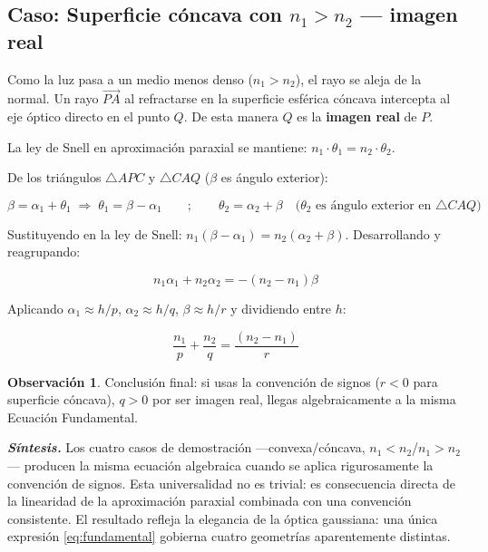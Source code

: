 \documentclass[12pt, a4paper]{article}
\theoremstyle{definition}
\newtheorem{observacion}{Observación}[section]
\begin{document}
\subsection{Caso: Superficie cóncava con \texorpdfstring{\(n_1 > n_2\)}{n1 > n2}
            --- imagen real}

Como la luz pasa a un medio menos denso (\(n_1 > n_2\)), el rayo se aleja de la normal.
Un rayo \(\overrightarrow{PA}\) al refractarse en la superficie esférica cóncava intercepta
al eje óptico directo en el punto \(Q\). De esta manera \(Q\) es la \textbf{imagen real}
de \(P\).

La ley de Snell en aproximación paraxial se mantiene: \(n_1 \cdot \theta_1 = n_2 \cdot
\theta_2\).

De los triángulos \(\triangle APC\) y \(\triangle CAQ\) (\(\beta\) es ángulo exterior):

\[
  \beta = \alpha_1 + \theta_1 \;\Rightarrow\; \theta_1 = \beta - \alpha_1 \qquad;\qquad
  \theta_2 = \alpha_2 + \beta \quad\text{(\(\theta_2\) es ángulo exterior en \(\triangle
  CAQ\))}
\]

Sustituyendo en la ley de Snell: \(n_1(\beta - \alpha_1) = n_2(\alpha_2 + \beta)\).
Desarrollando y reagrupando:

\[
  n_1\alpha_1 + n_2\alpha_2 = -(n_2 - n_1)\beta
\]

Aplicando \(\alpha_1 \approx h/p\), \(\alpha_2 \approx h/q\), \(\beta \approx h/r\) y
dividiendo entre \(h\):

\begin{equation}
  \frac{n_1}{p} + \frac{n_2}{q} = \frac{(n_2 - n_1)}{r}
  \label{eq:concava_n1mayor}
\end{equation}

\begin{observacion}
Conclusión final: si usas la convención de signos (\(r < 0\) para superficie cóncava),
\(q > 0\) por ser imagen real, llegas algebraicamente a la misma Ecuación Fundamental.
\end{observacion}

\textit{\textbf{Síntesis.}} Los cuatro casos de demostración —convexa/cóncava,
\(n_1 < n_2\)/\(n_1 > n_2\)— producen la misma ecuación algebraica cuando se aplica
rigurosamente la convención de signos. Esta universalidad no es trivial: es consecuencia
directa de la linearidad de la aproximación paraxial combinada con una convención
consistente. El resultado refleja la elegancia de la óptica gaussiana: una única expresión
\eqref{eq:fundamental} gobierna cuatro geometrías aparentemente distintas.
\end{document}
